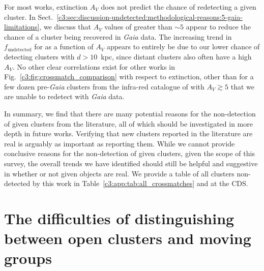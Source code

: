 For most works, extinction $A_V$ does not predict the chance of redetecting a given cluster. In Sect.~\ref{c3:sec:discussion-undetected:methodological-reasons:5-gaia-limitations}, we discuss that $A_V$ values of greater than $\sim5$ appear to reduce the chance of a cluster being recovered in \emph{Gaia} data. The increasing trend in $f_\text{undetected}$ for \cite{cantat-gaudin_clusters_2020} as a function of $A_V$ appears to entirely be due to our lower chance of detecting clusters with $d>10$~kpc, since distant clusters also often have a high $A_V$. No other clear correlations exist for other works in Fig.~\ref{c3:fig:crossmatch_comparison} with respect to extinction, other than for a few dozen pre-\emph{Gaia} clusters from the infra-red catalogue of \cite{kharchenko_global_2013} with $A_V \gtrsim 5$ that we are unable to redetect with \emph{Gaia} data.

In summary, we find that there are many potential reasons for the non-detection of given clusters from the literature, all of which should be investigated in more depth in future works. Verifying that new clusters reported in the literature are real is arguably as important as reporting them. While we cannot provide conclusive reasons for the non-detection of given clusters, given the scope of this survey, the overall trends we have identified should still be helpful and suggestive in whether or not given objects are real. We provide a table of all clusters non-detected by this work in Table~\ref{c3:app:tab:all_crossmatches} and at the CDS.




\section{The difficulties of distinguishing between open clusters and moving groups}\label{c3:sec:discussion-moving_groups}

